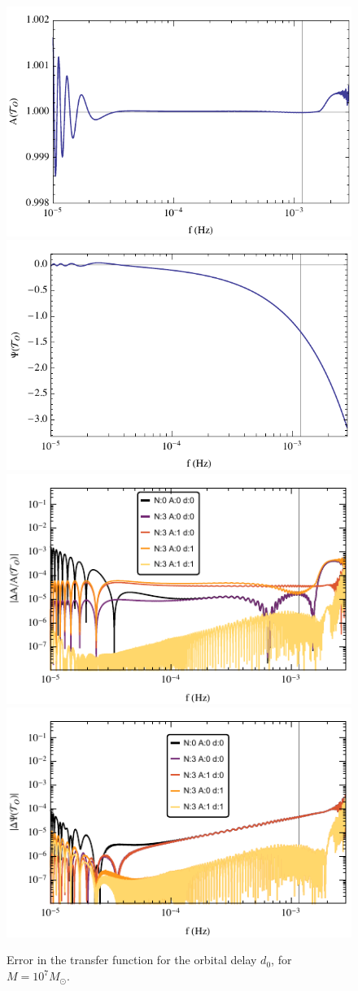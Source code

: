 \documentclass[aps,showpacs,twocolumn,
prd,superscriptaddress,nofootinbib]{revtex4-1}
\newcommand{\Msol}{M_{\odot}}
\begin{document}
\begin{figure}
  \centering
  \includegraphics[width=.48\linewidth]{plots/LISAtransferM1e7dOamp.pdf}
  \hspace{0.2cm}
  \includegraphics[width=.48\linewidth]{plots/LISAtransferM1e7dOphase.pdf}
  \includegraphics[width=.48\linewidth]{plots/LISAerrorM1e7dOamp.pdf}
  \hspace{0.2cm}
  \includegraphics[width=.48\linewidth]{plots/LISAerrorM1e7dOphase.pdf}
  \caption{Error in the transfer function for the orbital delay $d_{0}$, for $M=10^{7} \Msol$.}
  \label{fig:LISAerrorM1e7orb}
\end{figure}
\end{document}
